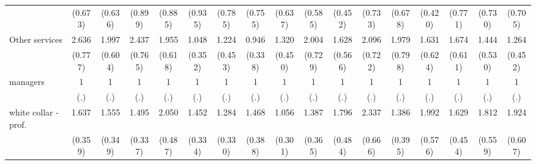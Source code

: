 {\begin{tabular}{l*{16}{c}}
                    &     (0.673)         &     (0.636)         &     (0.899)         &     (0.885)         &     (0.935)         &     (0.785)         &     (0.755)         &     (0.637)         &     (0.585)         &     (0.452)         &     (0.733)         &     (0.678)         &     (0.420)         &     (0.771)         &     (0.730)         &     (0.705)         \\
[1em]
Other services      &       2.636\sym{**} &       1.997\sym{*}  &       2.437\sym{**} &       1.955\sym{*}  &       1.048         &       1.224         &       0.946         &       1.320         &       2.004         &       1.628         &       2.096\sym{*}  &       1.979         &       1.631         &       1.674         &       1.444         &       1.264         \\
                    &     (0.777)         &     (0.604)         &     (0.765)         &     (0.618)         &     (0.352)         &     (0.453)         &     (0.338)         &     (0.450)         &     (0.729)         &     (0.566)         &     (0.722)         &     (0.798)         &     (0.624)         &     (0.611)         &     (0.530)         &     (0.452)         \\
[1em]
managers            &           1         &           1         &           1         &           1         &           1         &           1         &           1         &           1         &           1         &           1         &           1         &           1         &           1         &           1         &           1         &           1         \\
                    &         (.)         &         (.)         &         (.)         &         (.)         &         (.)         &         (.)         &         (.)         &         (.)         &         (.)         &         (.)         &         (.)         &         (.)         &         (.)         &         (.)         &         (.)         &         (.)         \\
[1em]
white collar - prof.&       1.637\sym{*}  &       1.555\sym{*}  &       1.495         &       2.050\sym{**} &       1.452         &       1.284         &       1.468         &       1.056         &       1.387         &       1.796\sym{*}  &       2.337\sym{**} &       1.386         &       1.992\sym{*}  &       1.629         &       1.812         &       1.924\sym{*}  \\
                    &     (0.359)         &     (0.349)         &     (0.337)         &     (0.487)         &     (0.334)         &     (0.330)         &     (0.388)         &     (0.301)         &     (0.365)         &     (0.484)         &     (0.666)         &     (0.395)         &     (0.576)         &     (0.454)         &     (0.559)         &     (0.607)         \\

\end{tabular}}
